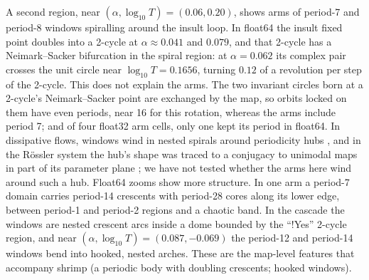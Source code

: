 \documentclass[11pt,letterpaper]{article}
\begin{document}
A second region, near $(\alpha,\log_{10}T)=(0.06,0.20)$, shows arms of period-7 and period-8 windows spiralling around
the insult loop. In float64 the insult fixed point doubles into a 2-cycle at $\alpha\approx0.041$ and $0.079$, and
that 2-cycle has a Neimark--Sacker bifurcation in the spiral region: at $\alpha=0.062$ its complex pair crosses the
unit circle near $\log_{10}T=0.1656$, turning $0.12$ of a revolution per step of the 2-cycle. This does not explain
the arms. The two invariant circles born at a 2-cycle's Neimark--Sacker point are exchanged by the map, so orbits
locked on them have even periods, near 16 for this rotation, whereas the arms include period 7; and of four float32
arm cells, only one kept its period in float64. In dissipative flows, windows wind in nested spirals around
periodicity hubs \cite{vitolo2011hubs}, and in the R\"ossler system the hub's shape was traced to a conjugacy to
unimodal maps in part of its parameter plane \cite{jones2012rossler}; we have not tested whether the arms here wind around such a hub. Float64 zooms
show more structure. In one arm a period-7 domain
carries period-14 crescents with period-28 cores along its lower edge, between period-1 and period-2 regions and a
chaotic band. In the cascade the windows are nested crescent arcs inside a dome bounded by the ``!Yes'' 2-cycle
region, and near $(\alpha,\log_{10}T)=(0.087,-0.069)$ the period-12 and period-14 windows bend into hooked, nested
arches. These are the map-level features that accompany shrimp (a periodic body with doubling crescents; hooked
windows).
\end{document}
